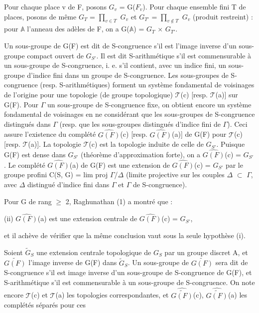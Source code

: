 \documentclass[10pt,a4paper]{article}
\begin{document}
\smallskip
\noindent Pour chaque place v de F, posons \ensuremath{G_v} = G(\ensuremath{F_v}). Pour chaque ensemble fini T de places, posons de même \ensuremath{G_T} = \ensuremath{∏_{v∈T}} \ensuremath{G_v} et \ensuremath{G_{T′}} = \ensuremath{∏_{v∉T}} \ensuremath{G_v} (produit restreint) : pour \ensuremath{𝔸} l'anneau des adèles de F, on a G(\ensuremath{𝔸}) = \ensuremath{G_T} \ensuremath{×} \ensuremath{G_{T′}}.\par
\smallskip
\noindent Un sous-groupe de G(F) est dit de S-congruence s'il est l'image inverse d'un sous-groupe compact ouvert de \ensuremath{G_{S′}}. Il est dit S-arithmétique s'il est commensurable à un sous-groupe de S-congruence, i. e. s'il contient, avec un indice fini, un sous-groupe d'indice fini dans un groupe de S-congruence. Les sous-groupes de S-congruence (resp. S-arithmétiques) forment un système fondamental de voisinages de l'origine pour une topologie (de groupe topologique) \ensuremath{𝒯}(c) [resp. \ensuremath{𝒯}(a)] sur G(F). Pour \ensuremath{Γ} un sous-groupe de S-congruence fixe, on obtient encore un système fondamental de voisinages en ne considérant que les sous-groupes de S-congruence distingués dans \ensuremath{Γ} (resp. que les sous-groupes distingués d'indice fini de \ensuremath{Γ}). Ceci assure l'existence du complété \ensuremath{\widehat{G(F)}}(c) [resp. \ensuremath{\widehat{G(F)}}(a)] de G(F) pour \ensuremath{𝒯}(c) [resp. \ensuremath{𝒯}(a)]. La topologie \ensuremath{𝒯}(c) est la topologie induite de celle de \ensuremath{G_{S′}}. Puisque G(F) est dense dans \ensuremath{G_{S′}} (théorème d'approximation forte), on a \ensuremath{\widehat{G(F)}}(c) = \ensuremath{G_{S′}}. Le complété \ensuremath{\widehat{G(F)}}(a) de G(F) est une extension de \ensuremath{\widehat{G(F)}}(c) = \ensuremath{G_{S′}} par le groupe profini C(S, G) = lim proj \ensuremath{Γ}/\ensuremath{Δ} (limite projective sur les couples \ensuremath{Δ} \ensuremath{⊂} \ensuremath{Γ}, avec \ensuremath{Δ} distingué d'indice fini dans \ensuremath{Γ} et \ensuremath{Γ} de S-congruence).\par
\smallskip
\noindent Pour G de rang \ensuremath{≥} 2, Raghunathan (1) a montré que :\par
\smallskip
\noindent (ii)    \ensuremath{\widehat{G(F)}}(a) est une extension centrale de \ensuremath{\widehat{G(F)}}(c) = \ensuremath{G_{S′}},\par
\smallskip
\noindent et il achève de vérifier que la même conclusion vaut sous la seule hypothèse (i).\par
\smallskip
\noindent Soient \ensuremath{\widetilde{G}_S} une extension centrale topologique de \ensuremath{G_S} par un groupe discret A, et \ensuremath{\widetilde{G(F)}} l'image inverse de G(F) dans \ensuremath{\widetilde{G}_S}. Un sous-groupe de \ensuremath{\widetilde{G(F)}} sera dit de S-congruence s'il est image inverse d'un sous-groupe de S-congruence de G(F), et S-arithmétique s'il est commensurable à un sous-groupe de S-congruence. On note encore \ensuremath{𝒯}(c) et \ensuremath{𝒯}(a) les topologies correspondantes, et \ensuremath{\widehat{\widetilde{G(F)}}}(c), \ensuremath{\widehat{\widetilde{G(F)}}}(a) les complétés séparés pour ces\par
\clearpage
{}\hypertarget{authority-page-0002}{}
\end{document}
